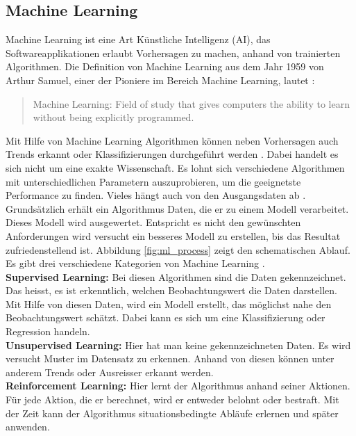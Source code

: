 \subsection{Machine Learning}
Machine Learning ist eine Art Künstliche Intelligenz (AI), das Softwareapplikationen erlaubt Vorhersagen zu machen, anhand von trainierten Algorithmen.
Die Definition von Machine Learning aus dem Jahr 1959 von Arthur Samuel, einer der Pioniere im Bereich Machine Learning, lautet \cite{what_is_ml}:
  \begin{quote}
    Machine Learning: Field of study that gives computers the ability to learn without being explicitly programmed.
  \end{quote}
Mit Hilfe von Machine Learning Algorithmen können neben Vorhersagen auch Trends erkannt oder Klassifizierungen durchgeführt werden \cite{ml_book}.
Dabei handelt es sich nicht um eine exakte Wissenschaft. Es lohnt sich verschiedene Algorithmen mit unterschiedlichen Parametern auszuprobieren, um die geeignetste Performance zu finden. Vieles hängt auch von den Ausgangsdaten ab \cite{ml_azure}.\\
%
Grundsätzlich erhält ein Algorithmus Daten, die er zu einem Modell verarbeitet. Dieses Modell wird ausgewertet. Entspricht es nicht den gewünschten Anforderungen wird versucht ein besseres Modell zu erstellen, bis das Resultat zufriedenstellend ist. Abbildung \ref{fig:ml_process} zeigt den schematischen Ablauf.\\

\newline
%
Es gibt drei verschiedene Kategorien von Machine Learning \cite{super_unsuper}.\\
\textbf{Supervised Learning:}	Bei diesen Algorithmen sind die Daten gekennzeichnet. Das heisst, es ist erkenntlich, welchen Beobachtungswert die Daten darstellen. Mit Hilfe von diesen Daten, wird ein Modell erstellt, das möglichst nahe den Beobachtungswert schätzt. Dabei kann es sich um eine Klassifizierung oder Regression handeln.\\[2ex]
%
\textbf{Unsupervised Learning:} Hier hat man keine gekennzeichneten Daten. Es wird versucht Muster im Datensatz zu erkennen. Anhand von diesen können unter anderem Trends oder Ausreisser erkannt werden.\\[2ex]
%
\textbf{Reinforcement Learning:} Hier lernt der Algorithmus anhand seiner Aktionen. Für jede Aktion, die er berechnet, wird er entweder belohnt oder bestraft. Mit der Zeit kann der Algorithmus situationsbedingte Abläufe erlernen und später anwenden.\\[2ex]
